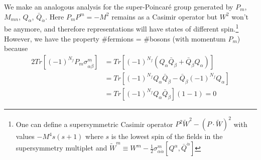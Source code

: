 \documentclass[a4paper,12pt]{article}
\numberwithin{equation}{section}
\numberwithin{exe}{section}
\newcommand{\Qb}{{\bar Q}}
\renewcommand{\a}{{\alpha}}
\newcommand{\ad}{{\dot\alpha}}
\newcommand{\bd}{{\dot\beta}}
\newcommand{\s}{{\sigma}}
\begin{document}
We make an analogous analysis for the super-Poincar\'e group generated by $P_m$, $M_{mn}$, $Q_\a$, $\Qb_\ad$. Here $P_m P^m = -M^2$ remains as a Casimir operator but $W^2$ won't be anymore, and therefore representations will have states of different spin.\footnote{One can define a supersymmetric Casimir operator $P^2 \tilde W^2 - (P\cdot \tilde W)^2$ with values $-M^4 s(s+1)$ where $s$ is the lowest spin of the fields in the supersymmetry multiplet and $\tilde W^m \equiv W^m- \frac{1}{2}\sigma^m_{\a\dot\alpha} [Q^\a, \bar Q^{\dot\a}]$}
However, we have the property \#fermions = \#bosons (with momentum $P_m$) because
	\begin{align}
	2 Tr\left[(-1)^{N_f} P_m\s^m_{\a\bd}\right] & = Tr\left[ (-1)^{N_f}(Q_\a\Qb_\bd + \Qb_\bd Q_\a) \right] \nonumber \\
	& = Tr \left[(-1)^{N_f} Q_\a \Qb_\bd - \Qb_\bd (-1)^{N_f} Q_\a\right] \nonumber \\
	& = Tr \left[(-1)^{N_f} Q_\a\Qb_\bd\right](1-1) = 0
	\end{align}
\end{document}
